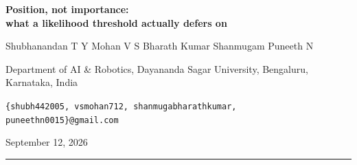 \documentclass[10pt]{article}
\begin{document}
\begin{center}
{\LARGE\bfseries Position, not importance:\\[0.25em]
what a likelihood threshold actually defers on\par}
\vspace{1.1em}
{\large Shubhanandan T Y \quad Mohan V S \quad Bharath Kumar Shanmugam \quad Puneeth N\par}
\vspace{0.35em}
{\small Department of AI \& Robotics, Dayananda Sagar University, Bengaluru, Karnataka, India\par}
\vspace{0.2em}
{\small\texttt{\{shubh442005, vsmohan712, shanmugabharathkumar, puneethn0015\}@gmail.com}\par}
\vspace{0.9em}
{\small September 12, 2026\par}
\end{center}
\vspace{0.4em}
\hrule
\vspace{1.0em}
\end{document}
